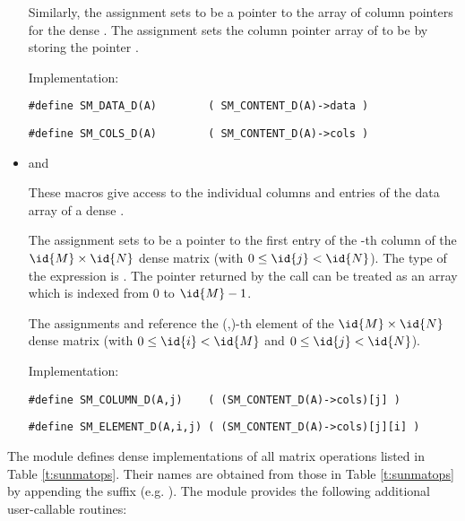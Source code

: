 \begin{itemize}
  Similarly, the assignment  sets  to be     
  a pointer to the array of column pointers for the dense  . 
  The assignment  sets the column pointer
  array of  to be  by storing the pointer .                   
  
  Implementation:

  \verb|#define SM_DATA_D(A)        ( SM_CONTENT_D(A)->data )|

  \verb|#define SM_COLS_D(A)        ( SM_CONTENT_D(A)->cols )|


\item {} and 
                                                            
  These macros give access to the individual columns and entries of
  the data array of a dense .

  The assignment  sets  to be
  a pointer to the first entry of the -th column of the $\id{M} \times \id{N}$
  dense matrix  (with $0 \le \id{j} < \id{N}$).  The type of the
  expression  is .  The pointer
  returned by the call  can be treated as  
  an array which is indexed from $0$ to $\id{M}-1$.

  The assignments  and  reference the (,)-th element of the
  $\id{M} \times \id{N}$ dense matrix  (with $0 \le \id{i} < \id{M}$ and
  $0 \le \id{j} < \id{N}$).

  Implementation:

  \verb|#define SM_COLUMN_D(A,j)    ( (SM_CONTENT_D(A)->cols)[j] )|

  \verb|#define SM_ELEMENT_D(A,i,j) ( (SM_CONTENT_D(A)->cols)[j][i] )|

\end{itemize}
The {\sunmatdense} module defines dense implementations of all matrix
operations listed in Table \ref{t:sunmatops}. Their names are obtained
from those in Table \ref{t:sunmatops} by appending the
suffix  (e.g. ). 
The module {\sunmatdense} provides the following additional
user-callable routines: 
